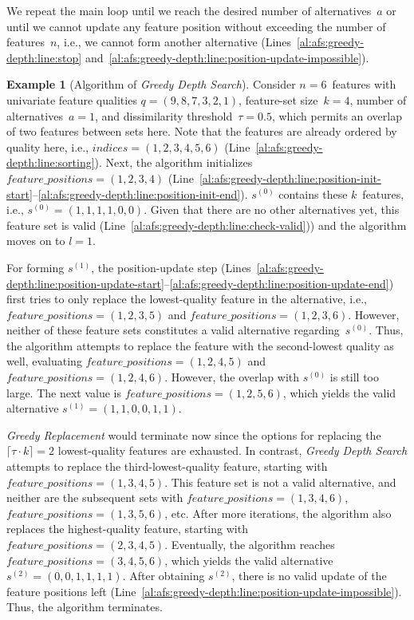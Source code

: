 \documentclass{article}
\theoremstyle{definition}
\newtheorem{example}{Example}
\begin{document}
We repeat the main loop until we reach the desired number of alternatives~$a$ or until we cannot update any feature position without exceeding the number of features~$n$, i.e., we cannot form another alternative (Lines~\ref{al:afs:greedy-depth:line:stop} and~\ref{al:afs:greedy-depth:line:position-update-impossible}).
%
\begin{example}[Algorithm of \emph{Greedy Depth Search}]
	Consider $n=6$~features with univariate feature qualities $q = (9,8,7,3,2,1)$, feature-set size~$k=4$, number of alternatives~$a=1$, and dissimilarity threshold~$\tau = 0.5$, which permits an overlap of two features between sets here.
	Note that the features are already ordered by quality here, i.e., $\mathit{indices} = (1,2,3,4,5,6)$ (Line~\ref{al:afs:greedy-depth:line:sorting}).
	Next, the algorithm initializes $\mathit{feature\_positions} = (1,2,3,4)$ (Line~\ref{al:afs:greedy-depth:line:position-init-start}--\ref{al:afs:greedy-depth:line:position-init-end}).
	$s^{(0)}$ contains these $k$~features, i.e., $s^{(0)} = (1,1,1,1,0,0)$.
	Given that there are no other alternatives yet, this feature set is valid (Line~\ref{al:afs:greedy-depth:line:check-valid})) and the algorithm moves on to $l=1$.
	
	For forming $s^{(1)}$, the position-update step (Lines~\ref{al:afs:greedy-depth:line:position-update-start}--\ref{al:afs:greedy-depth:line:position-update-end}) first tries to only replace the lowest-quality feature in the alternative, i.e., $\mathit{feature\_positions} = (1,2,3,5)$ and $\mathit{feature\_positions} = (1,2,3,6)$.
	However, neither of these feature sets constitutes a valid alternative regarding~$s^{(0)}$.
	Thus, the algorithm attempts to replace the feature with the second-lowest quality as well, evaluating $\mathit{feature\_positions} = (1,2,4,5)$ and $\mathit{feature\_positions} = (1,2,4,6)$.
	However, the overlap with $s^{(0)}$ is still too large.
	The next value is $\mathit{feature\_positions} = (1,2,5,6)$, which yields the valid alternative $s^{(1)} = (1,1,0,0,1,1)$.
	
	\emph{Greedy Replacement} would terminate now since the options for replacing the $\lceil \tau \cdot k \rceil = 2$ lowest-quality features are exhausted.
	In contrast, \emph{Greedy Depth Search} attempts to replace the third-lowest-quality feature, starting with $\mathit{feature\_positions} = (1,3,4,5)$.
	This feature set is not a valid alternative, and neither are the subsequent sets with $\mathit{feature\_positions} = (1,3,4,6)$, $\mathit{feature\_positions} = (1,3,5,6)$, etc.
	After more iterations, the algorithm also replaces the highest-quality feature, starting with $\mathit{feature\_positions} = (2,3,4,5)$.
	Eventually, the algorithm reaches $\mathit{feature\_positions} = (3,4,5,6)$, which yields the valid alternative $s^{(2)} = (0,0,1,1,1,1)$.
	After obtaining $s^{(2)}$, there is no valid update of the feature positions left (Line~\ref{al:afs:greedy-depth:line:position-update-impossible}).
	Thus, the algorithm terminates.
	\label{ex:afs:greedy-depth:algorithm}
\end{example}
\end{document}
